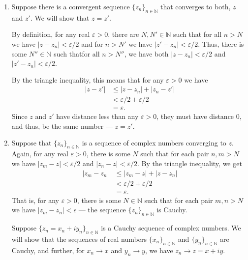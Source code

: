\documentclass[12 pt, letterpaper]{hmcpset}
\begin{document}
\begin{enumerate}
	\item Suppose there is a convergent sequence $\{ z_{n} \}_{n \in \mathbb{N}}$ that converges to both, $z$ and $z'$. We will show that $z = z'$. 

		By definition, for any real $\varepsilon > 0$, there are $N, N' \in \mathbb{N}$ such that for all $n > N$ we have $\lvert z - z_{n} \rvert < \varepsilon / 2$ and for $n > N'$ we have $\lvert z' - z_{n} \rvert < \varepsilon / 2$. Thus, there is some $N'' \in \mathbb{N}$ such thatfor all $n > N''$, we have both $\lvert z - z_{n} \rvert < \varepsilon / 2$ and $\lvert z' - z_{n} \rvert < \varepsilon / 2$.

		By the triangle inequality, this means that for any $\varepsilon > 0$ we have
		\begin{align*}
			\lvert z - z' \rvert & \le \lvert z - z_{n} \rvert + \lvert z_{n} - z' \rvert \\
					     & < \varepsilon/2 + \varepsilon / 2 \\ 
					     & = \varepsilon.
		\end{align*}
		Since $z$ and $z'$ have distance less than any $\varepsilon > 0$, they must have distance $0$, and thus, be the same number --- $z = z'$.
	\item Suppose that $\{ z_{n} \}_{n \in \mathbb{N}}$ is a sequence of complex numbers converging to $z$. Again, for any real $\varepsilon > 0$, there is some $N$ such that for each pair $n, m > N$ we have $\lvert z_{m} - z \rvert < \varepsilon / 2$ and $\lvert z_{n} - z \rvert < \varepsilon / 2$. By the triangle inequality, we get
		\begin{align*}
			\lvert z_{m} - z_{n} \rvert & \le \lvert z_{m} - z \rvert + \lvert z - z_{n} \rvert \\ 
						    & < \varepsilon / 2 + \varepsilon / 2 \\
						    & = \varepsilon.
		\end{align*}
		That is, for any $\varepsilon > 0$, there is some $N \in \mathbb{N}$ such that for each pair $m, n > N$ we have $\lvert z_{m} - z_{n} \rvert < \epsilon$ --- the sequence $\{ z_{n} \}_{n \in \mathbb{N}}$ is Cauchy.

		Suppose $\{ z_{n} = x_{n} + i y_{n} \}_{n \in \mathbb{N}}$ is a Cauchy sequence of complex numbers. We will show that the sequences of real numbers $\{ x_{n} \}_{n \in \mathbb{N}}$ and $\{ y_{n} \}_{n \in \mathbb{N}}$ are Cauchy, and further, for $x_{n} \to x$ and $y_{n} \to y$, we have $z_{n} \to z = x + i y$.


\end{enumerate}
\end{document}
